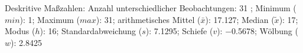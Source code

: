 				\label{tableValues:bsys01a_o}
				\vspace*{-\baselineskip}
                    \begin{noten}
                	    \note{} Deskritive Maßzahlen:
                	    Anzahl unterschiedlicher Beobachtungen: 31%
                	    ; 
                	      Minimum ($min$): 1; 
                	      Maximum ($max$): 31; 
                	      arithmetisches Mittel ($\bar{x}$): \num[round-mode=places,round-precision=2]{17,127}; 
                	      Median ($\tilde{x}$): 17; 
                	      Modus ($h$): 16; 
                	      Standardabweichung ($s$): \num[round-mode=places,round-precision=2]{7,1295}; 
                	      Schiefe ($v$): \num[round-mode=places,round-precision=2]{-0,5678}; 
                	      Wölbung ($w$): \num[round-mode=places,round-precision=2]{2,8425}
                     \end{noten}


